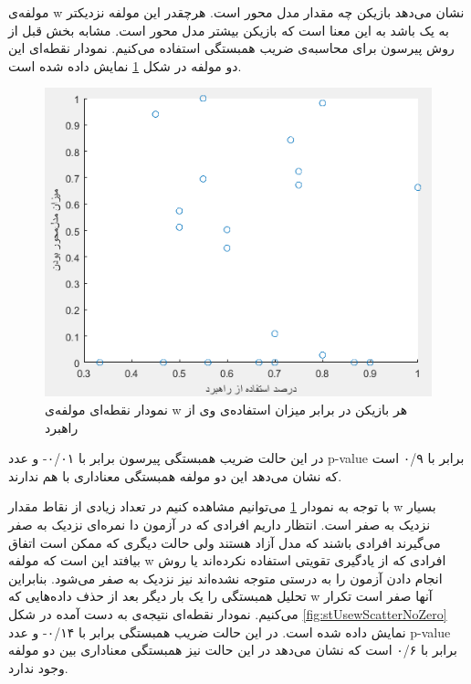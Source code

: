 \documentclass[twoside, a4paper,11pt]{book}
\numberwithin{equation}{chapter}
\numberwithin{table}{chapter}
\numberwithin{figure}{chapter}
\numberwithin{equation}{chapter}
\begin{document}
مولفه‌ی w نشان می‌دهد بازیکن چه مقدار مدل محور است. هرچقدر این مولفه نزدیکتر به یک باشد به این معنا است که بازیکن بیشتر مدل محور است. مشابه بخش قبل از روش پیرسون برای محاسبه‌ی ضریب همبستگی استفاده می‌کنیم. نمودار نقطه‌ای این دو مولفه در شکل \ref{fig:stUsewScatter} نمایش داده شده است.

\begin{figure}
\centering
\includegraphics[scale=0.8]{Figures/stUsewScatter.png}
\caption{\label{fig:stUsewScatter}
نمودار نقطه‌ای مولفه‌ی w هر بازیکن در برابر میزان استفاده‌ی وی از راهبرد
}
\end{figure}

در این حالت ضریب همبستگی پیرسون برابر با ۰/۰۱- و عدد p-value برابر با ۰/۹ است که نشان می‌دهد این دو مولفه همبستگی معناداری با هم ندارند.

با توجه به نمودار \ref{fig:stUsewScatter} می‌توانیم مشاهده کنیم در تعداد زیادی از نقاط مقدار w بسیار نزدیک به صفر است. انتظار داریم افرادی که در آزمون دا نمره‌ای نزدیک به صفر می‌گیرند افرادی باشند که مدل آزاد هستند ولی حالت دیگری که ممکن است اتفاق بیافتد این است که مولفه w افرادی که از یادگیری تقویتی استفاده نکرده‌اند یا روش انجام دادن آزمون را به درستی متوجه نشده‌اند نیز نزدیک به صفر می‌شود. بنابراین تحلیل همبستگی را یک بار دیگر بعد از حذف داده‌هایی که w آنها صفر است تکرار می‌کنیم. نمودار نقطه‌ای نتیجه‌ی به دست آمده در شکل \ref{fig:stUsewScatterNoZero} نمایش داده شده است. در این حالت ضریب همبستگی برابر با ۰/۱۴- و عدد p-value برابر با ۰/۶ است که نشان می‌دهد در این حالت نیز همبستگی معناداری بین دو مولفه وجود ندارد.
\end{document}
